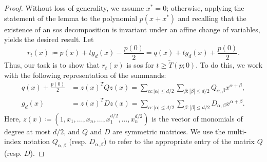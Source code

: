 \documentclass[12pt]{article}
\newcommand{\defeq}{\coloneq}
\theoremstyle{remark}
\begin{document}
\begin{proof}
Without loss of generality, we assume $x^*=0$; otherwise, applying the statement of the lemma to the polynomial $p(x+x^*)$ and recalling that the existence of an sos decomposition is invariant under an affine change of variables, yields the desired result. 
Let $$r_t(x)\defeq p(x)+tg_d(x)-\frac{p(0)}2=q(x)+tg_d(x)+\frac{p(0)}2.$$ 
Thus, our task is to show that $r_t(x)$ is sos for $t\ge \tilde{T}(p;0)$. 
To do this, we work with the following representation of the summands: 
\[\begin{aligned}
    q(x)+\frac{p(0)}{2}&=z(x)^TQz(x)=\sum_{\alpha:|\alpha|\le d/2}\sum_{\beta:|\beta|\le d/2} Q_{\alpha,\beta}x^{\alpha+\beta},\\
    g_d(x)&=z(x)^TDz(x)=\sum_{\alpha:|\alpha|\le d/2}\sum_{\beta:|\beta|\le d/2} D_{\alpha,\beta}x^{\alpha+\beta}.
\end{aligned}\]
Here, $z(x)\defeq(1,x_1,\ldots,x_n,\ldots,x_1^{d/2},\ldots,x_n^{d/2})$ is the vector of monomials of degree at most $d/2$, and $Q$ and $D$ are symmetric matrices. We use the multi-index notation 
$Q_{\alpha,\beta}$ (resp. $D_{\alpha,\beta}$) to refer to the appropriate entry of the matrix $Q$ (resp. $D$). 



\end{proof}
\end{document}
